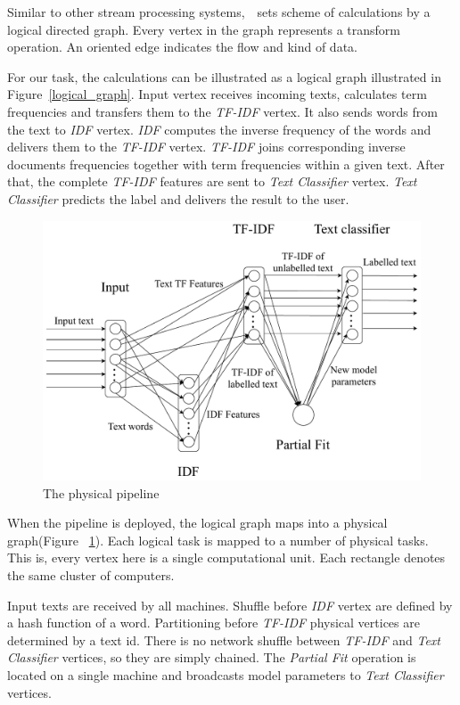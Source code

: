 Similar to other stream processing systems,~\FlameStream\ sets scheme of calculations by a logical directed graph. Every vertex in the graph represents a transform operation. An oriented edge indicates the flow and kind of data.

For our task, the calculations can be illustrated as a logical graph illustrated in Figure~\ref{logical_graph}. Input vertex receives incoming texts, calculates term frequencies and transfers them to the {\em TF-IDF} vertex. It also sends words from the text to {\em IDF} vertex. {\em IDF} computes the inverse frequency of the words and delivers them to the {\em TF-IDF} vertex. {\em TF-IDF} joins corresponding inverse documents frequencies together with term frequencies within a given text. After that, the complete {\em TF-IDF} features are sent to {\em Text Classifier} vertex. {\em Text Classifier} predicts the label and delivers the result to the user.

\begin{figure}[htbp]
  \centering
  \includegraphics[scale=0.375]{pics/physical-graph}
  \caption{The physical pipeline}
  \label {physical_graph}
\end{figure}

When the pipeline is deployed, the logical graph maps into a physical graph(Figure ~\ref{physical_graph}). Each logical task is mapped to a number of physical tasks. This is, every vertex here is a single computational unit. Each rectangle denotes the same cluster of computers.

Input texts are received by all machines. Shuffle before {\em IDF} vertex are defined by a hash function of a word. Partitioning before {\em TF-IDF} physical vertices are determined by a text id. There is no network shuffle between {\em TF-IDF} and {\em Text Classifier} vertices, so they are simply chained. The {\em Partial Fit} operation is located on a single machine and broadcasts model parameters to {\em Text Classifier} vertices.

